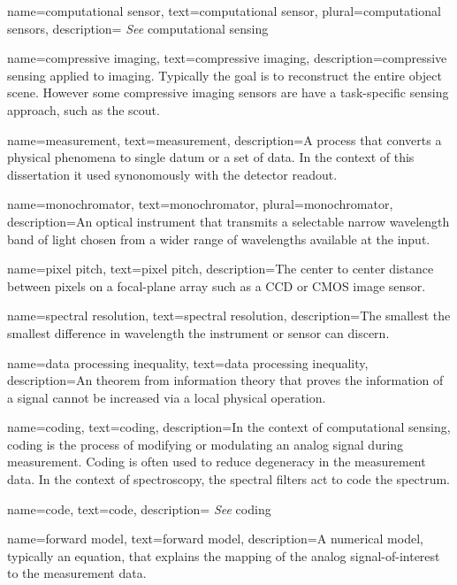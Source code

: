 {
name={computational sensor},
text={computational sensor},
plural={computational sensors},
description={ \emph{See} \gls{computational sensing}}
}


{
name={compressive imaging},
text={compressive imaging},
description={\gls{compressive sensing} applied to imaging. Typically the goal is to reconstruct the entire object scene. However some compressive imaging sensors are have a task-specific sensing approach, such as the \gls{scout}.}
}

{
name={measurement},
text={measurement},
description={A process that converts a physical phenomena to single datum or a set of data. In the context of this dissertation it used synonomously with the detector readout.}
}

{
name={monochromator},
text={monochromator},
plural={monochromator},
description={An optical instrument that transmits a selectable narrow wavelength band of light chosen from a wider range of wavelengths available at the input.}
}

{
name={pixel pitch},
text={pixel pitch},
description={The center to center distance between pixels on a focal-plane array such as a CCD or CMOS image sensor.}
}

{
name={spectral resolution},
text={spectral resolution},
description={The smallest the smallest difference in wavelength the instrument or sensor can discern.}
}

{
name={data processing inequality},
text={data processing inequality},
description={An theorem from information theory that proves the information of a signal cannot be increased via a local physical operation.}
}

{
name={coding},
text={coding},
description={In the context of computational sensing, coding is the process of modifying or modulating an analog signal during measurement. Coding is often used to reduce degeneracy in the measurement data. In the context of spectroscopy, the spectral filters act to code the spectrum.  }
}

{
name={code},
text={code},
description={ \emph{See} \gls{coding}}
}

{
name={forward model},
text={forward model},
description={A numerical model, typically an equation, that explains the mapping of the analog signal-of-interest to the measurement data.}
}

